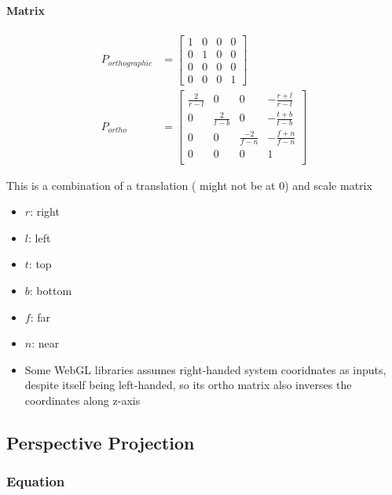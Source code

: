     \paragraph{Matrix}
    \begin{align}
      P_{orthographic} &=
      \begin{bmatrix}
        1 & 0 & 0 & 0 \\
        0 & 1 & 0 & 0 \\
        0 & 0 & 0 & 0 \\
        0 & 0 & 0 & 1
      \end{bmatrix} \\
      P_{ortho} &=
      \begin{bmatrix}
        \frac{2}{r - l} & 0 & 0 & -\frac{r + l}{r - l} \\
        0 & \frac{2}{t - b} & 0 & -\frac{t + b}{t - b} \\
        0 & 0 & \frac{-2}{f - n} & -\frac{f + n}{f - n} \\
        0 & 0 & 0 & 1 \\
      \end{bmatrix}
    \end{align}

    This is a combination of a translation ( might not be at 0)
    and scale matrix

    \begin{itemize}
      \item $ r $: right
      \item $ l $: left
      \item $ t $: top
      \item $ b $: bottom
      \item $ f $: far
      \item $ n $: near
      \item Some WebGL libraries assumes right-handed system cooridnates as
      inputs, despite itself being left-handed, so its ortho matrix also
      inverses the coordinates along z-axis
    \end{itemize}

  \subsection{Perspective Projection}

    \subsubsection{Equation}

